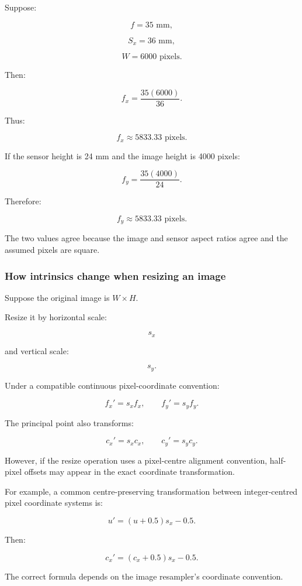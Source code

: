 Suppose:

\[
 f=35\text{ mm},
\]

\[
 S_x=36\text{ mm},
\]

\[
 W=6000\text{ pixels}.
\]

Then:

\[
 f_x=\frac{35(6000)}{36}.
\]

Thus:

\[
 \boxed{ f_x\approx5833.33\text{ pixels} }.
\]

If the sensor height is 24 mm and the image height is 4000 pixels:

\[
 f_y=\frac{35(4000)}{24}.
\]

Therefore:

\[
 \boxed{ f_y\approx5833.33\text{ pixels} }.
\]

The two values agree because the image and sensor aspect ratios agree and the assumed pixels are square.

\subsubsection{How intrinsics change when resizing an image}\label{how-intrinsics-change-when-resizing-an-image}

Suppose the original image is \(W\times H\).

Resize it by horizontal scale:

\[
 s_x
\]

and vertical scale:

\[
 s_y.
\]

Under a compatible continuous pixel-coordinate convention:

\[
 \boxed{ f_x'=s_xf_x, \qquad f_y'=s_yf_y }.
\]

The principal point also transforms:

\[
 \boxed{ c_x'=s_xc_x, \qquad c_y'=s_yc_y }.
\]

However, if the resize operation uses a pixel-centre alignment convention, half-pixel offsets may appear in the exact coordinate transformation.

For example, a common centre-preserving transformation between integer-centred pixel coordinate systems is:

\[
 u'=(u+0.5)s_x-0.5.
\]

Then:

\[
 \boxed{ c_x'=(c_x+0.5)s_x-0.5 }.
\]

The correct formula depends on the image resampler's coordinate convention.

